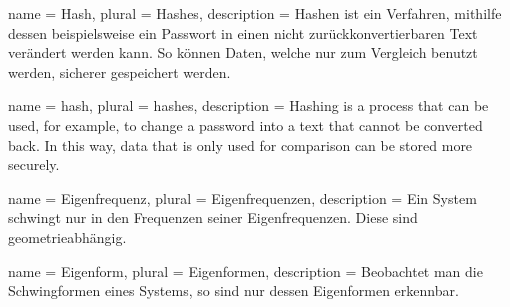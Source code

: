 

{
    name = {Hash},
    plural = {Hashes},
    description = {Hashen ist ein Verfahren, mithilfe dessen beispielsweise ein Passwort in einen nicht zurückkonvertierbaren Text verändert werden kann. So können Daten, welche nur zum Vergleich benutzt werden, sicherer gespeichert werden.}
}

{
    name = {hash},
    plural = {hashes},
    description = {Hashing is a process that can be used, for example, to change a password into a text that cannot be converted back. In this way, data that is only used for comparison can be stored more securely.}
}

{
    name = {Eigenfrequenz},
    plural = {Eigenfrequenzen},
    description = {Ein System schwingt nur in den Frequenzen seiner Eigenfrequenzen. Diese sind geometrieabhängig.}
}

{
    name = {Eigenform},
    plural = {Eigenformen},
    description = {Beobachtet man die Schwingformen eines Systems, so sind nur dessen Eigenformen erkennbar.}
}